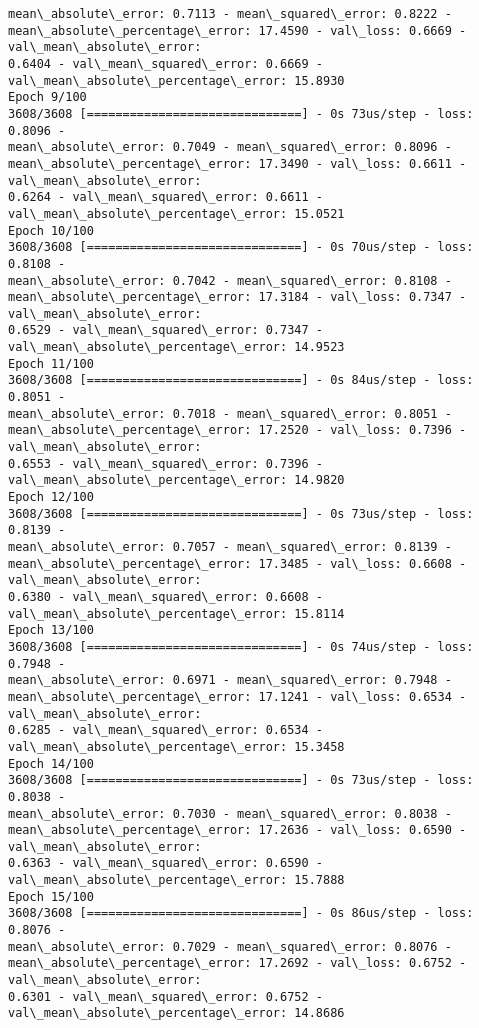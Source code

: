 \documentclass[11pt]{article}
\begin{document}
\begin{Verbatim}[commandchars=\\\{\},fontsize=\footnotesize]
mean\_absolute\_error: 0.7113 - mean\_squared\_error: 0.8222 -
mean\_absolute\_percentage\_error: 17.4590 - val\_loss: 0.6669 - val\_mean\_absolute\_error:
0.6404 - val\_mean\_squared\_error: 0.6669 - val\_mean\_absolute\_percentage\_error: 15.8930
Epoch 9/100
3608/3608 [==============================] - 0s 73us/step - loss: 0.8096 -
mean\_absolute\_error: 0.7049 - mean\_squared\_error: 0.8096 -
mean\_absolute\_percentage\_error: 17.3490 - val\_loss: 0.6611 - val\_mean\_absolute\_error:
0.6264 - val\_mean\_squared\_error: 0.6611 - val\_mean\_absolute\_percentage\_error: 15.0521
Epoch 10/100
3608/3608 [==============================] - 0s 70us/step - loss: 0.8108 -
mean\_absolute\_error: 0.7042 - mean\_squared\_error: 0.8108 -
mean\_absolute\_percentage\_error: 17.3184 - val\_loss: 0.7347 - val\_mean\_absolute\_error:
0.6529 - val\_mean\_squared\_error: 0.7347 - val\_mean\_absolute\_percentage\_error: 14.9523
Epoch 11/100
3608/3608 [==============================] - 0s 84us/step - loss: 0.8051 -
mean\_absolute\_error: 0.7018 - mean\_squared\_error: 0.8051 -
mean\_absolute\_percentage\_error: 17.2520 - val\_loss: 0.7396 - val\_mean\_absolute\_error:
0.6553 - val\_mean\_squared\_error: 0.7396 - val\_mean\_absolute\_percentage\_error: 14.9820
Epoch 12/100
3608/3608 [==============================] - 0s 73us/step - loss: 0.8139 -
mean\_absolute\_error: 0.7057 - mean\_squared\_error: 0.8139 -
mean\_absolute\_percentage\_error: 17.3485 - val\_loss: 0.6608 - val\_mean\_absolute\_error:
0.6380 - val\_mean\_squared\_error: 0.6608 - val\_mean\_absolute\_percentage\_error: 15.8114
Epoch 13/100
3608/3608 [==============================] - 0s 74us/step - loss: 0.7948 -
mean\_absolute\_error: 0.6971 - mean\_squared\_error: 0.7948 -
mean\_absolute\_percentage\_error: 17.1241 - val\_loss: 0.6534 - val\_mean\_absolute\_error:
0.6285 - val\_mean\_squared\_error: 0.6534 - val\_mean\_absolute\_percentage\_error: 15.3458
Epoch 14/100
3608/3608 [==============================] - 0s 73us/step - loss: 0.8038 -
mean\_absolute\_error: 0.7030 - mean\_squared\_error: 0.8038 -
mean\_absolute\_percentage\_error: 17.2636 - val\_loss: 0.6590 - val\_mean\_absolute\_error:
0.6363 - val\_mean\_squared\_error: 0.6590 - val\_mean\_absolute\_percentage\_error: 15.7888
Epoch 15/100
3608/3608 [==============================] - 0s 86us/step - loss: 0.8076 -
mean\_absolute\_error: 0.7029 - mean\_squared\_error: 0.8076 -
mean\_absolute\_percentage\_error: 17.2692 - val\_loss: 0.6752 - val\_mean\_absolute\_error:
0.6301 - val\_mean\_squared\_error: 0.6752 - val\_mean\_absolute\_percentage\_error: 14.8686

\end{Verbatim}
\end{document}
